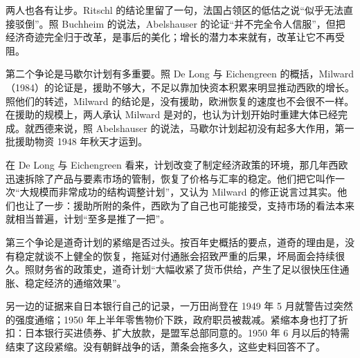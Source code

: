 两人也各有让步。Ritschl 的结论里留了一句，法国占领区的低估之说“似乎无法直接驳倒”\cite{ritschl1985}。照 Buchheim 的说法，Abelshauser 的论证“并不完全令人信服”，但把经济奇迹完全归于改革，是事后的美化；增长的潜力本来就有，改革让它不再受阻\cite{buchheim1988}。

第二个争论是马歇尔计划有多重要。照 De Long 与 Eichengreen 的概括，Milward（1984）的论证是，援助不够大，不足以靠加快资本积累来明显推动西欧的增长\cite{delong1991}。照他们的转述，Milward 的结论是，没有援助，欧洲恢复的速度也不会很不一样\cite{delong1991}。在援助的规模上，两人承认 Milward 是对的，也认为计划开始时重建大体已经完成\cite{delong1991}。就西德来说，照 Abelshauser 的说法，马歇尔计划起初没有起多大作用，第一批援助物资 1948 年秋天才运到\cite{abelshauser1981}。

在 De Long 与 Eichengreen 看来，计划改变了制定经济政策的环境，那几年西欧迅速拆除了产品与要素市场的管制，恢复了价格与汇率的稳定\cite{delong1991}。他们把它叫作一次“大规模而非常成功的结构调整计划”，又认为 Milward 的修正说言过其实\cite{delong1991}。他们也让了一步：援助所附的条件，西欧为了自己也可能接受，支持市场的看法本来就相当普遍，计划“至多是推了一把”\cite{delong1991}。

第三个争论是道奇计划的紧缩是否过头。按百年史概括的要点，道奇的理由是，没有稳定就谈不上健全的恢复，拖延对付通胀会招致严重的后果，坏局面会持续很久\cite{boj1985}。照财务省的政策史，道奇计划“大幅收紧了货币供给，产生了足以很快压住通胀、稳定经济的通缩效果”\cite{mof2010}。

另一边的证据来自日本银行自己的记录，一万田尚登在 1949 年 5 月就警告过突然的强度通缩；1950 年上半年零售物价下跌，政府职员被裁减\cite{boj1985,frus1949jp}。紧缩本身也打了折扣：日本银行买进债券、扩大放款，是盟军总部同意的\cite{mof2010}。1950 年 6 月以后的特需结束了这段紧缩。没有朝鲜战争的话，萧条会拖多久，这些史料回答不了。

